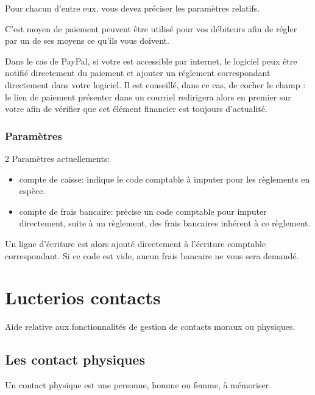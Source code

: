 \documentclass[a4paper,10pt,oneside,french]{sphinxmanual}
\begin{document}
Pour chacun d’entre eux, vous devez préciser les paramètres relatifs.

C’est moyen de paiement peuvent être utilisé pour vos débiteurs afin de régler par un de ses moyens ce qu’ils vous doivent.

Dans le cas de PayPal, si votre  est accessible par internet, le logiciel peux être notifié directement du paiement et ajouter un réglement correspondant directement dans votre logiciel.
Il est conseillé, dans ce cas, de cocher le champ : le lien de paiement présenter dans un courriel redirigera alors en premier sur votre  afin de vérifier que cet élément financier est toujours d’actualité.


\subsection{Paramètres}
\label{\detokenize{payoff/config:parametres}}
2 Paramètres actuellements:
\begin{itemize}
\item {} 
compte de caisse: indique le code comptable à imputer pour les règlements en espèce.

\item {} 
compte de frais bancaire: prècise un code comptable pour imputer directement, suite à un règlement, des frais bancaires inhérent à ce règlement.

\end{itemize}

Un ligne d’écriture est alors ajouté directement à l’écriture comptable correspondant.
Si ce code est vide, aucun frais bancaire ne vous sera demandé.


\chapter{Lucterios contacts}
\label{\detokenize{contacts/index:lucterios-contacts}}\label{\detokenize{contacts/index::doc}}
Aide relative aux fonctionnalités de gestion de contacts moraux ou physiques.


\section{Les contact physiques}
\label{\detokenize{contacts/individual:les-contact-physiques}}\label{\detokenize{contacts/individual::doc}}
Un contact physique est une personne, homme ou femme, à mémoriser.
\end{document}
